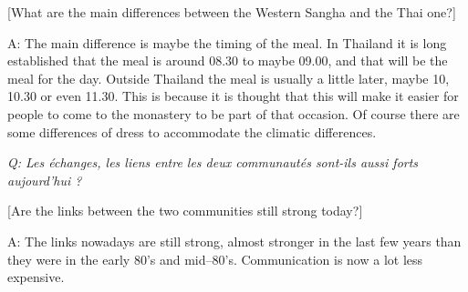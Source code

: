 {[}What are the main differences between the Western Sangha and the Thai
one?{]}

A: The main difference is maybe the timing of the meal. In Thailand it
is long established that the meal is around 08.30 to maybe 09.00, and
that will be the meal for the day. Outside Thailand the meal is usually
a little later, maybe 10, 10.30 or even 11.30. This is because it is
thought that this will make it easier for people to come to the
monastery to be part of that occasion. Of course there are some
differences of dress to accommodate the climatic differences.

\emph{Q: Les échanges, les liens entre les deux communautés sont-ils
aussi forts aujourd'hui ?}

{[}Are the links between the two communities still strong today?{]}

A: The links nowadays are still strong, almost stronger in the last few
years than they were in the early 80's and mid--80's. Communication is
now a lot less expensive.

